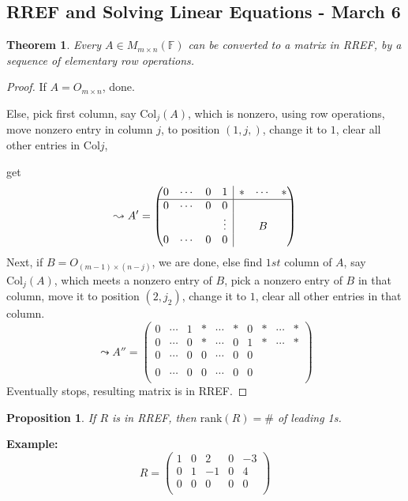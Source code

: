 \documentclass[12pt]{article}
\theoremstyle{plain}
\newtheorem{theorem}{Theorem}[subsection]
\newtheorem{proposition}{Proposition}[subsection]
\newcommand{\rank}{\mathrm{rank}}
\newcommand{\Col}{\mathrm{Col}}
\newcommand{\mF}{{\mathbb{F}}}
\newcommand{\rvline}{\hspace*{-\arraycolsep}\vline\hspace*{-\arraycolsep}}
\begin{document}
\subsection{RREF and Solving Linear Equations - March 6}
\begin{theorem}
	Every $A \in M_{m\times n}(\mF)$ can be converted to a matrix in RREF,
	by a sequence of elementary row operations. 
\end{theorem}
\begin{proof}
	If $A = O_{m\times n}$, done. 

	Else, pick first column, say $\Col_j(A)$, which is nonzero, using row 
	operations, move nonzero entry in column $j$, to position $(1, j,)$, change
	it to $1$, clear all other entries in $\Col j$, 

	get 
	\[
		\leadsto A' = 
		\begin{pmatrix}
			0 & \cdots & 0	& 1		& \rvline	& *	& \cdots & *	\\	\hline
			0 & \cdots & 0	& 0		& \rvline	&  	&  & 	\\
			  &		   &	& \vdots& \rvline	&	&   B    &		\\
			0 & \cdots & 0	& 0		& \rvline	& 	&   & 	\\
		\end{pmatrix}
	\]
	Next, if $B = O_{(m-1)\times (n-j)}$, we are done, else
	find $1st$ column of $A$, say $\Col_j(A)$, which meets a nonzero entry of 
	$B$, pick a nonzero entry of $B$ in that column, move it to position 
	$(2, j_2)$, change it to $1$, clear all other entries in that column. 
	\[
		\leadsto A'' = 
		\begin{pmatrix}
			0 & \cdots  & 1 & * & \cdots & * & 0 & * & \cdots & * \\ \hline
			0 & \cdots  & 0 & * & \cdots & 0 & 1 & * & \cdots & * \\ \hline
			0 & \cdots  & 0 & 0 & \cdots & 0 & 0 & 	&  	& 	\\
			  &		    &   &   &	    &   &	&   &	&	\\
			0 & \cdots  & 0 & 0 & \cdots & 0 & 0 &   & 	&	\\
		\end{pmatrix}
	\]
	Eventually stops, resulting matrix is in RREF.
\end{proof}

\begin{proposition}
	If $R$ is in RREF, then $\rank(R) = \#$ of leading 1s. 
\end{proposition}

\textbf{Example: }
\[
	R = 
	\begin{pmatrix}
		1 & 0 & 2 & 0 & -3	\\
		0 & 1 & -1 & 0 & 4	\\
		0 & 0 & 0 & 0 & 0	\\
	\end{pmatrix}
\]
\end{document}
